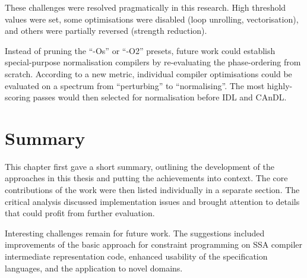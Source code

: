     These challenges were resolved pragmatically in this research.
    High threshold values were set, some optimisations were disabled
    (loop unrolling, vectorisation), and others were partially reversed
    (strength reduction).

    Instead of pruning the ``-Os'' or ``-O2'' presets, future work could
    establish special-purpose normalisation compilers by re-evaluating the
    phase-ordering from scratch.
    According to a new metric, individual compiler optimisations could be
    evaluated on a spectrum from ``perturbing'' to ``normalising''.
    The most highly-scoring passes would then selected for normalisation before
    IDL and CAnDL.
    
\section{Summary}

    This chapter first gave a short summary, outlining the development of the
    approaches in this thesis and putting the achievements into context.
    The core contributions of the work were then listed individually in a
    separate section.
    The critical analysis discussed implementation issues and brought attention
    to details that could profit from further evaluation.

    Interesting challenges remain for future work.
    The suggestions included improvements of the basic approach for constraint
    programming on SSA compiler intermediate representation code, enhanced
    usability of the specification languages, and the application to novel domains.
